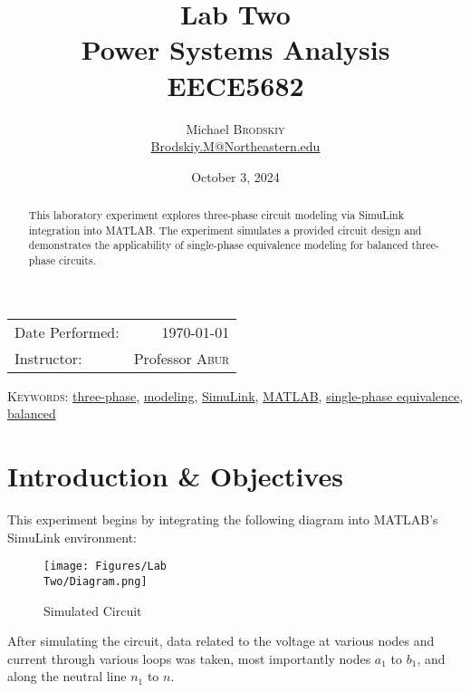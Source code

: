 \documentclass[
	letterpaper, %
	10pt, %
]{CSUniSchoolLabReport}
\title{Lab Two\\ Power Systems Analysis \\ EECE5682} %
\author{Michael \textsc{Brodskiy}\\ \small \href{mailto:Brodskiy.M@Northeastern.edu}{Brodskiy.M@Northeastern.edu}}
\date{October 3, 2024} %
\begin{document}
\maketitle %

\begin{center}
	\begin{tabular}{l r}
		Date Performed: & \today \\ %
		Instructor: & Professor \textsc{Abur} \\ %
	\end{tabular}
\end{center}

\newpage

\begin{abstract}

  This laboratory experiment explores three-phase circuit modeling via SimuLink integration into MATLAB. The experiment simulates a provided circuit design and demonstrates the applicability of single-phase equivalence modeling for balanced three-phase circuits.

\end{abstract}

\begin{flushleft}

  \textsc{Keywords:} \underline{three-phase}, \underline{modeling}, \underline{SimuLink}, \underline{MATLAB}, \underline{single-phase equivalence}, \underline{balanced}

\end{flushleft}

\newpage

\section{Introduction \& Objectives}

This experiment begins by integrating the following diagram into MATLAB's SimuLink environment:

\begin{figure}[H]
  \centering
  \texttt{[image: Figures/Lab\\ Two/Diagram.png]}
  \caption{Simulated Circuit}
  \label{fig:1}
\end{figure}

After simulating the circuit, data related to the voltage at various nodes and current through various loops was taken, most importantly nodes $a_1$ to $b_1$, and along the neutral line $n_1$ to $n$.
\end{document}
